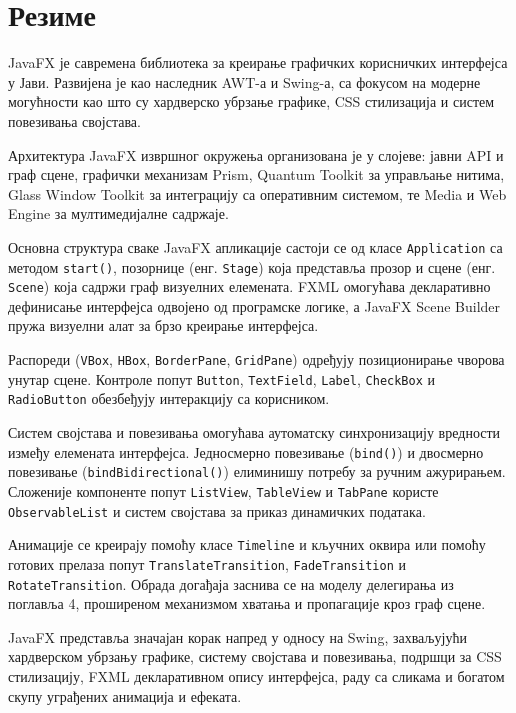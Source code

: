 \section{Резиме}

JavaFX је савремена библиотека за креирање графичких корисничких интерфејса у Јави. Развијена је као наследник AWT-а и Swing-а, са фокусом на модерне могућности као што су хардверско убрзање графике, CSS стилизација и систем повезивања својстава.

Архитектура JavaFX извршног окружења организована је у слојеве: јавни API и граф сцене, графички механизам Prism, Quantum Toolkit за управљање нитима, Glass Window Toolkit за интеграцију са оперативним системом, те Media и Web Engine за мултимедијалне садржаје.

Основна структура сваке JavaFX апликације састоји се од класе \texttt{Application} са методом \texttt{start()}, позорнице (енг. \texttt{Stage}) која представља прозор и сцене (енг. \texttt{Scene}) која садржи граф визуелних елемената. FXML омогућава декларативно дефинисање интерфејса одвојено од програмске логике, а JavaFX Scene Builder пружа визуелни алат за брзо креирање интерфејса.

Распореди (\texttt{VBox}, \texttt{HBox}, \texttt{BorderPane}, \texttt{GridPane}) одређују позиционирање чворова унутар сцене. Контроле попут \texttt{Button}, \texttt{TextField}, \texttt{Label}, \texttt{CheckBox} и \texttt{RadioButton} обезбеђују интеракцију са корисником.

Систем својстава и повезивања омогућава аутоматску синхронизацију вредности између елемената интерфејса. Једносмерно повезивање (\texttt{bind()}) и двосмерно повезивање (\texttt{bindBidirectional()}) елиминишу потребу за ручним ажурирањем. Сложеније компоненте попут \texttt{ListView}, \texttt{TableView} и \texttt{TabPane} користе \texttt{ObservableList} и систем својстава за приказ динамичких података.

Анимације се креирају помоћу класе \texttt{Timeline} и кључних оквира или помоћу готових прелаза попут \texttt{TranslateTransition}, \texttt{FadeTransition} и \texttt{RotateTransition}. Обрада догађаја заснива се на моделу делегирања из поглавља 4, проширеном механизмом хватања и пропагације кроз граф сцене.

JavaFX представља значајан корак напред у односу на Swing, захваљујући хардверском убрзању графике, систему својстава и повезивања, подршци за CSS стилизацију, FXML декларативном опису интерфејса, раду са сликама и богатом скупу уграђених анимација и ефеката.



